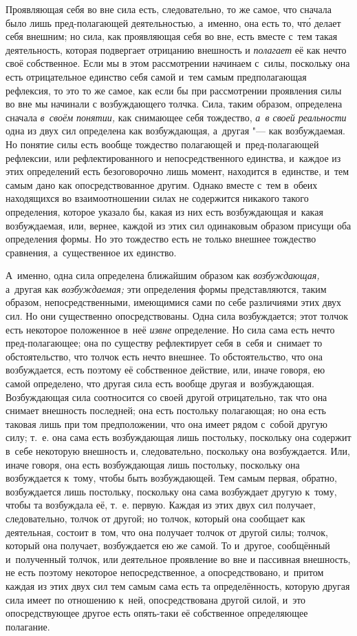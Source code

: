 Проявляющая себя во вне сила есть, следовательно, то же самое, что сначала
было лишь пред-полагающей деятельностью, а~именно, она есть то, чт\'{о} делает
себя внешним; но сила, как проявляющая себя во вне, есть вместе с~тем такая
деятельность, которая подвергает отрицанию внешность и
{\em полагает} её как нечто своё собственное. Если мы в
этом рассмотрении начинаем с~силы, поскольку она есть отрицательное
единство себя самой и~тем самым предполагающая рефлексия, то это то же
самое, как если бы при рассмотрении проявления силы во вне мы начинали с
возбуждающего толчка. Сила, таким образом, определена сначала
{\em в~своём понятии,} как снимающее себя тождество,
{\em а~в своей реальности} одна из двух сил определена
как возбуждающая, а~другая "--- как возбуждаемая. Но понятие силы есть вообще
тождество полагающей и~пред-полагающей рефлексии, или рефлектированного и
непосредственного единства, и~каждое из этих определений есть безоговорочно
лишь момент, находится в~единстве, и~тем самым дано как опосредствованное
другим. Однако вместе с~тем в~обеих находящихся во взаимоотношении силах не
содержится никакого такого определения, которое указало бы, какая из них
есть возбуждающая и~какая возбуждаемая, или, вернее, каждой из этих сил
одинаковым образом присущи оба определения формы. Но это тождество есть не
только внешнее тождество сравнения, а~существенное их единство.

А~именно, одна сила определена ближайшим образом как
{\em возбуждающая,} а~другая как {\em возбуждаемая;} эти определения формы
представляются, таким образом, непосредственными, имеющимися сами по себе
различиями этих двух сил. Но они существенно опосредствованы. Одна сила
возбуждается; этот толчок есть некоторое положенное в~неё
{\em извне} определение. Но сила сама есть нечто
пред-полагающее; она по существу рефлектирует себя в~себя и~снимает то
обстоятельство, что толчок есть нечто внешнее. То обстоятельство, что она
возбуждается, есть поэтому её собственное действие, или, иначе говоря, ею
самой определено, что другая сила есть вообще другая и~возбуждающая.
Возбуждающая сила соотносится со своей другой отрицательно, так что она
снимает внешность последней; она есть постольку полагающая; но она есть
таковая лишь при том предположении, что она имеет рядом с~собой другую
силу; т.~е. она сама есть возбуждающая лишь постольку, поскольку она
содержит в~себе некоторую внешность и, следовательно, поскольку она
возбуждается. Или, иначе говоря, она есть возбуждающая лишь постольку,
поскольку она возбуждается к~тому, чтобы быть возбуждающей. Тем самым
первая, обратно, возбуждается лишь постольку, поскольку она сама возбуждает
другую к~тому, чтобы та возбуждала её, т.~е. первую. Каждая из этих двух
сил получает, следовательно, толчок от другой; но толчок, который она
сообщает как деятельная, состоит в~том, что она получает толчок от другой
силы; толчок, который она получает, возбуждается ею же самой. То и~другое,
сообщённый и~полученный толчок, или деятельное проявление во вне и
пассивная внешность, не есть поэтому некоторое непосредственное, а
опосредствовано, и~притом каждая из этих двух сил тем самым сама есть та
определённость, которую другая сила имеет по отношению к~ней,
опосредствована другой силой, и~это опосредствующее другое есть опять-таки
её собственное определяющее полагание.

